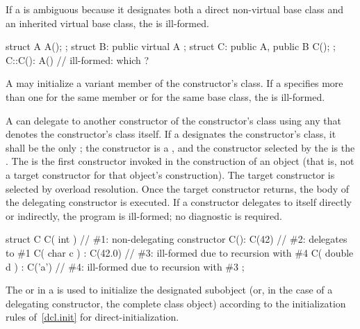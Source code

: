 \pnum
If a
is ambiguous because it designates both a direct non-virtual base class and
an inherited virtual base class, the
is ill-formed.
\begin{example}

\begin{codeblock}
struct A { A(); };
struct B: public virtual A { };
struct C: public A, public B { C(); };
C::C(): A() { }                 // ill-formed: which ?
\end{codeblock}
\end{example}

\pnum
A
may initialize a variant member of the
constructor's class.
If a
specifies more than one
for the same member or for the same base class,
the
is ill-formed.

\pnum
A  can delegate to another
constructor of the constructor's class using any
 that denotes the constructor's class itself. If a
 designates the constructor's class,
it shall be the only ; the constructor
is a , and the constructor selected by the
 is the .
The  is the first constructor invoked in
the construction of an object (that is, not a target constructor for that
object's construction). The target constructor is selected by overload resolution.
Once the target constructor returns, the body of the delegating constructor
is executed. If a constructor delegates to itself directly or indirectly,
the program is ill-formed; no diagnostic is required. \begin{example}

\begin{codeblock}
struct C {
  C( int ) { }                  // \#1: non-delegating constructor
  C(): C(42) { }                // \#2: delegates to \#1
  C( char c ) : C(42.0) { }     // \#3: ill-formed due to recursion with \#4
  C( double d ) : C('a') { }    // \#4: ill-formed due to recursion with \#3
};
\end{codeblock}
\end{example}

\pnum
{}%
%
The
or 
in a
is used to initialize the
designated subobject (or, in the case of a delegating constructor, the complete class object)
according to the initialization rules of~\ref{dcl.init} for direct-initialization.

